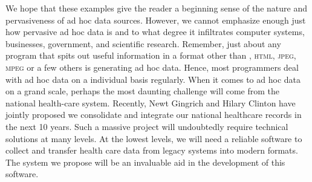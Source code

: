 \documentclass[11pt]{article}
\begin{document}
We hope that these examples give the reader a beginning sense of the
nature and pervasiveness of ad hoc data sources.  However, we cannot
emphasize enough just how pervasive ad hoc data is and to what degree
it infiltrates computer systems, businesses, government, and
scientific research.  Remember, just about any program that spits out
useful information in a format other than \xml{}, \textsc{html},
\textsc{jpeg}, \textsc{mpeg} or a few others is generating ad hoc
data.  Hence, most programmers deal with ad hoc data on a individual
basis regularly.  When it comes to ad hoc data on a grand scale,
perhaps the most daunting challenge will come from the national
health-care system.  Recently, Newt Gingrich and Hilary Clinton have
jointly proposed we consolidate and integrate our national healthcare
records in the next 10 years.  Such a massive project will undoubtedly
require technical solutions at many levels.  At the lowest levels, we
will need a reliable software to collect and transfer health care data
from legacy systems into modern formats.  The \datatype{} system we
propose will be an invaluable aid in the development of this software.
\end{document}
